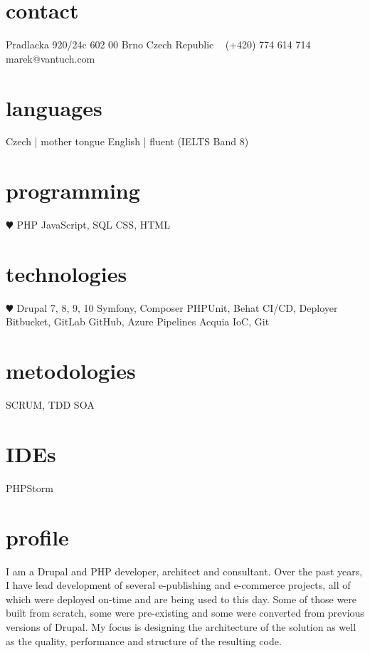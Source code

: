 \documentclass[]{friggeri-cv} %
\begin{document}


    \begin{aside}
        \section{contact}
        Pradlacka 920/24c
        602 00 Brno
        Czech Republic
        ~
        (+420) 774 614 714
        ~
        marek@vantuch.com
        \section{languages}
        Czech | mother tongue
        English | fluent
        (IELTS Band 8)
        \section{programming}
        {\color{red} $\varheartsuit$} PHP
        JavaScript, SQL
        CSS, HTML
        \section{technologies}
        {\color{red} $\varheartsuit$} Drupal 7, 8, 9, 10
        Symfony, Composer
        PHPUnit, Behat
        CI/CD, Deployer
        Bitbucket, GitLab
        GitHub, Azure Pipelines
        Acquia
        IoC, Git
        \section{metodologies}
        SCRUM, TDD
        SOA
        \section{IDEs}
        PHPStorm
    \end{aside}

    \section{profile}
    I am a Drupal and PHP developer, architect and consultant.
    Over the past years, I have lead development of several e-publishing and e-commerce projects, all of which were deployed on-time and are being used to this day.
    Some of those were built from scratch, some were pre-existing and some were converted from previous versions of Drupal.
    My focus is designing the architecture of the solution as well as the quality, performance and structure of the resulting code.
\end{document}
